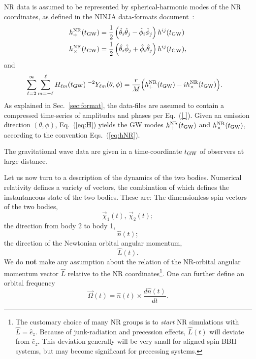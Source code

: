 \documentclass[11pt,tightenlines,article,amssymb,amsmath,amsfonts,superscriptaddress]{revtex4}
\newcommand{\EzNR}{\hat e_z}
\newcommand{\tNR}{\theta}
\newcommand{\pNR}{\phi}
\newcommand{\EtNR}{{\hat\theta}}
\newcommand{\EpNR}{{\hat\phi}}
\newcommand{\hpNR}{h_+^{\rm NR}}
\newcommand{\hcNR}{h_{\times}^{\rm NR}}
\newcommand{\nNR}{\hat{n}}
\newcommand{\lNR}{\hat L}
\newcommand{\tGW}{t_{\rm GW}}
\begin{document}
NR data is assumed to be represented by spherical-harmonic modes of the
NR coordinates, as defined in the NINJA data-formats
document~\cite{Brown:2007jx}:
\begin{subequations}\label{eq:hNR}
\begin{align}
  \hpNR(\tGW) & = \frac{1}{2}\left(\EtNR_i\EtNR_j-\EpNR_i\EpNR_j\right)h^{ij}(\tGW)\\
  \hcNR(\tGW) & = \frac{1}{2}\left(\EtNR_i\EpNR_j+\EpNR_i\EtNR_j\right)h^{ij}(\tGW),
\end{align}
\end{subequations}
and
\begin{align}\label{eq:H}
  \sum_{\ell=2}^\infty\sum_{m=-\ell}^\ell H_{\ell m}&(\tGW)\;^{-2}Y_{\ell m}(\tNR,\pNR)
  = \frac{r}{M}\Big(\hpNR(\tGW)-i\hcNR(\tGW)\Big). %
\end{align}
As explained in Sec.~\ref{sec:format}, the data-files are assumed to
contain a compressed time-series of amplitudes and phases per
Eq.~(\ref{ }).  Given an emission direction $(\tNR,\pNR)$,
Eq.~(\ref{eq:H}) yields the GW modes $\hpNR(\tGW)$ and $\hcNR(\tGW)$,
according to the convention Eqs.~(\ref{eq:hNR}).

The gravitational wave data are given in a time-coordinate $\tGW$ of
observers at large distance.

Let us now turn to a description of the dynamics of the two bodies.
Numerical relativity defines a variety of vectors, the combination of
which defines the instantaneous state of the two bodies.  These are:
The dimensionless spin vectors of the two bodies,
\begin{equation}\label{eq:chi}
  \vec\chi_1(t),\, \vec\chi_2(t);
\end{equation}
the direction from body 2 to body 1,
\begin{equation}
  \nNR(t);
\end{equation}
the direction of the Newtonian orbital angular momentum,
\begin{equation}
  \hat L(t).
\end{equation}
We do {\bf not} make any assumption about the relation of the
NR-orbital angular momentum vector $\lNR$ relative to the NR
coordinates\footnote{The customary choice of many NR groups is to
  \emph{start} NR simulations with $\lNR=\EzNR$.  Because of
  junk-radiation and precession effects, $\lNR(t)$ will deviate from
  $\EzNR$.  This deviation generally will be very small for
  aligned-spin BBH systems, but may become significant for precessing
  systems.}.
One can further define an orbital frequency
\begin{equation}\label{eq:Omega}
  \vec\Omega(t) = \nNR(t) \times \frac{d\nNR(t)}{dt}.
\end{equation}
\end{document}
